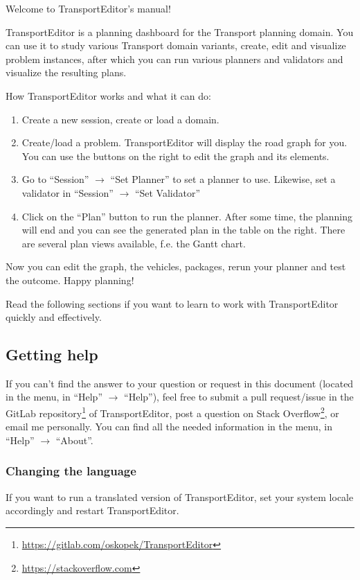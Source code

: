 Welcome to TransportEditor's manual!

TransportEditor is a planning dashboard for the Transport planning domain.
You can use it to study various Transport domain variants,
create, edit and visualize problem instances, after which you can
run various planners and validators and visualize the resulting plans.

How TransportEditor works and what it can do:

\begin{enumerate}
\item Create a new session, create or load a domain.

\item Create/load a problem. TransportEditor will display the road graph for you.
You can use the buttons on the right to edit the graph and its elements.

\item Go to ``Session'' $\to$ ``Set Planner'' to set a planner to use. Likewise, set a validator in
``Session'' $\to$ ``Set Validator''

\item{Click on the ``Plan'' button to run the planner. After some time, the planning will end and you can
see the generated plan in the table on the right. There are several plan views available, f.e. the Gantt chart.}
\end{enumerate}

Now you can edit the graph, the vehicles, packages, rerun your planner and test the outcome. Happy planning!

Read the following sections if you want to learn to work with TransportEditor quickly and effectively.

\subsection*{Getting help}
If you can't find the answer to your question or request in this document
(located in the menu, in ``Help'' $\to$ ``Help''),
feel free to submit a pull request/issue in
the GitLab repository\footnote{\url{https://gitlab.com/oskopek/TransportEditor}} of TransportEditor,
post a question on Stack Overflow\footnote{\url{https://stackoverflow.com}}, or email me personally.
You can find all the needed information in the menu, in ``Help'' $\to$ ``About''.

\subsubsection*{Changing the language}
If you want to run a translated version of TransportEditor,
set your system locale accordingly and restart TransportEditor.

